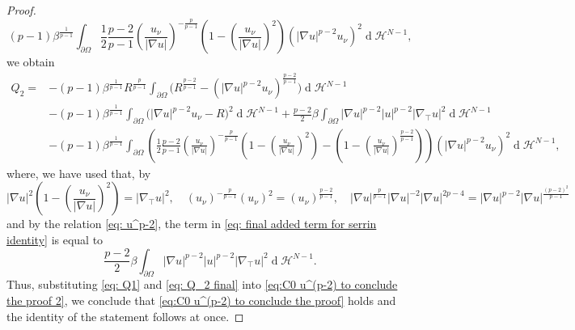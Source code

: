 \documentclass[10pt,a4paper]{amsart}
\numberwithin{equation}{section}
\renewcommand{\d}[1]{\ensuremath{\operatorname{d}\!{#1}}}
\begin{document}
\begin{proof}
    \begin{equation}\label{eq: final added term for serrin identity}
        (p-1) \beta^{\frac{1}{p-1}}  \int_{\partial\Omega}  \frac{1}{2} \frac{p-2}{p-1} \left(\frac{u_\nu}{|\nabla u|}\right)^{-\frac{p}{p-1}} \left(1- \left(\frac{u_\nu}{|\nabla u|}\right)^2 \right) (|\nabla u|^{p-2} u_\nu)^2 \d{}\mathcal{H}^{N-1},
    \end{equation}
    we obtain
    \begin{equation}\label{eq: Q_2 final}
    \begin{split}
        Q_2 =& - (p-1) \beta^{\frac{1}{p-1}} R^{\frac{p}{p-1}} \int_{\partial\Omega} \Big( R^{\frac{p-2}{p-1}} - (|\nabla u|^{p-2} u_\nu)^{\frac{p-2}{p-1}} \Big) \d{}\mathcal{H}^{N-1}
        \\
        & - (p-1) \beta^{\frac{1}{p-1}} \int_{\partial\Omega} \Big(|\nabla u|^{p-2} u_\nu - R \Big)^2  \d{}\mathcal{H}^{N-1} + \frac{p-2}{2}\beta \int_{\partial\Omega} |\nabla u|^{p-2}|u|^{p-2}|\nabla_\top u|^2 \d{}\mathcal{H}^{N-1}
        \\
        & - (p-1) \beta^{\frac{1}{p-1}}  \int_{\partial\Omega}  \left( \frac{1}{2} \frac{p-2}{p-1} \left(\frac{u_\nu}{|\nabla u|}\right)^{-\frac{p}{p-1}} \left(1- \left(\frac{u_\nu}{|\nabla u|}\right)^2 \right) - \left(1- \left(\frac{u_\nu}{|\nabla u|}\right)^{\frac{p-2}{p-1}} \right) \right) (|\nabla u|^{p-2} u_\nu)^2 \d{}\mathcal{H}^{N-1}, 
    \end{split}
    \end{equation}
    where, we have used that, by 
    \begin{equation*}
        |\nabla u|^2 \left(1- \left(\frac{u_\nu}{|\nabla u|}\right)^2 \right) = |\nabla_\top u|^2,\quad  (u_\nu)^{-\frac{p}{p-1}} (u_\nu)^2 = (u_\nu)^{\frac{p-2}{p-1}},\quad |\nabla u|^{\frac{p}{p-1}} |\nabla u|^{-2} |\nabla u|^{2p-4} = |\nabla u|^{p-2} |\nabla u|^{\frac{(p-2)^2}{p-1}}
    \end{equation*}
    and by the relation \eqref{eq: u^p-2}, the term in \eqref{eq: final added term for serrin identity} is equal to
    \begin{equation*}
        \frac{p-2}{2}\beta \int_{\partial\Omega} |\nabla u|^{p-2}|u|^{p-2}|\nabla_\top u|^2 \d{}\mathcal{H}^{N-1}.
    \end{equation*}
    Thus, substituting \eqref{eq: Q1} and \eqref{eq: Q_2 final} into \eqref{eq:C0 u^(p-2) to conclude the proof 2}, we conclude that \eqref{eq:C0 u^(p-2) to conclude the proof} holds and the identity of the statement follows at once.
    \end{proof}
\end{document}
